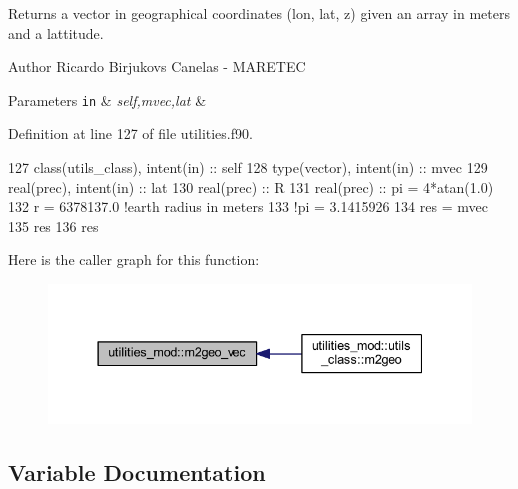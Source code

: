 Returns a vector in geographical coordinates (lon, lat, z) given an array in meters and a lattitude. 

\begin{DoxyAuthor}{Author}
Ricardo Birjukovs Canelas -\/ M\+A\+R\+E\+T\+EC 
\end{DoxyAuthor}

\begin{DoxyParams}[1]{Parameters}
\mbox{\tt in}  & {\em self,mvec,lat} & \\
\hline
\end{DoxyParams}


Definition at line 127 of file utilities.\+f90.


\begin{DoxyCode}
127     \textcolor{keywordtype}{class}(utils\_class), \textcolor{keywordtype}{intent(in)} :: self
128     \textcolor{keywordtype}{type}(vector), \textcolor{keywordtype}{intent(in)} :: mvec    
129     \textcolor{keywordtype}{real(prec)}, \textcolor{keywordtype}{intent(in)} :: lat
130     \textcolor{keywordtype}{real(prec)} :: R
131     \textcolor{keywordtype}{real(prec)} :: pi = 4*atan(1.0)
132     r = 6378137.0 \textcolor{comment}{!earth radius in meters}
133     \textcolor{comment}{!pi = 3.1415926}
134     res = mvec
135     res%
136     res%
\end{DoxyCode}
Here is the caller graph for this function\+:\nopagebreak
\begin{figure}[H]
\begin{center}
\leavevmode
\includegraphics[width=337pt]{namespaceutilities__mod_a70b21b18c8633b7fd4c3057530d3f16f_icgraph}
\end{center}
\end{figure}


\subsection{Variable Documentation}
\mbox{\label{namespaceutilities__mod_aa12c2506b3107528a2511d059186f12d}} 
